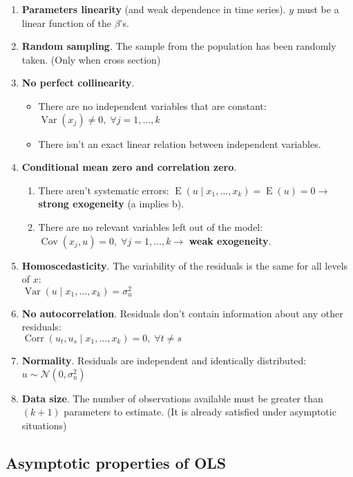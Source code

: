 \documentclass[10pt, a4paper, landscape]{article}
\DeclareMathOperator{\E}{E}
\DeclareMathOperator{\Var}{Var}
\DeclareMathOperator{\Cov}{Cov}
\DeclareMathOperator{\Corr}{Corr}
\begin{document}
\begin{multicols}{3}
\begin{enumerate}[leftmargin=*]
	\item \textbf{Parameters linearity} (and weak dependence in time series). \( y \) must be a linear function of the \( \beta \)'s.
	\item \textbf{Random sampling}. The sample from the population has been randomly taken. (Only when cross section)
	\item \textbf{No perfect collinearity}.
	\begin{itemize}[leftmargin=*]
		\item There are no independent variables that are constant: \( \Var(x_{j}) \neq 0, \; \forall j = 1, \ldots, k \)
		\item There isn't an exact linear relation between independent variables.
	\end{itemize}
	\item \textbf{Conditional mean zero and correlation zero}.
	\begin{enumerate}[leftmargin=*, label=\alph{*}.]
		\item There aren't systematic errors: \( \E(u \mid x_{1}, \ldots, x_{k}) = \E(u) = 0 \rightarrow \) \textbf{strong exogeneity} (a implies b).
		\item There are no relevant variables left out of the model: \( \Cov(x_{j}, u) = 0, \; \forall j = 1, \ldots, k \rightarrow \) \textbf{weak exogeneity}.
	\end{enumerate}
	\item \textbf{Homoscedasticity}. The variability of the residuals is the same for all levels of \( x \): \\ \( \Var(u \mid x_{1}, \ldots, x_{k}) = \sigma_{u}^{2} \)
	\item \textbf{No autocorrelation}. Residuals don't contain information about any other residuals: \\ \( \Corr(u_{t}, u_{s} \mid x_{1}, \ldots, x_{k}) = 0, \; \forall t \neq s \)
	\item \textbf{Normality}. Residuals are independent and identically distributed: \( u \sim \mathcal{N} (0, \sigma_{u}^{2}) \)
	\item \textbf{Data size}. The number of observations available must be greater than \( (k + 1) \) parameters to estimate. (It is already satisfied under asymptotic situations)
\end{enumerate}

\subsection*{Asymptotic properties of OLS}


\end{multicols}
\end{document}
